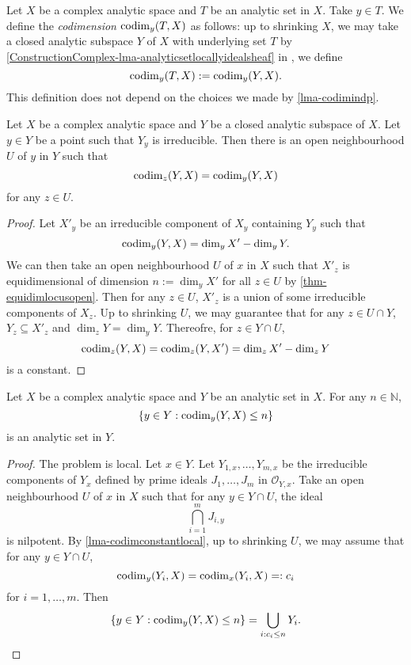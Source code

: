 \begin{definition}
    Let  $X$ be a complex analytic space and $T$ be an analytic set in $X$. Take $y\in T$. We define the \emph{codimension} $\operatorname{codim}_y(T,X)$ as follows: up to shrinking $X$, we may take a closed analytic subspace $Y$ of $X$ with underlying set $T$ by \cref{ConstructionComplex-lma-analyticsetlocallyidealsheaf} in , we define 
    \[
        \operatorname{codim}_y(T,X):=\operatorname{codim}_y(Y,X).  
    \]
    This definition does not depend on the choices we made by \cref{lma-codimindp}.
\end{definition}

\begin{lemma}\label{lma-codimconstantlocal}
    Let $X$ be a complex analytic space and $Y$ be a closed analytic subspace of $X$. Let $y\in Y$ be a point such that $Y_y$ is irreducible. Then there is an open neighbourhood $U$ of $y$ in $Y$ such that 
    \[
        \operatorname{codim}_z(Y,X)=\operatorname{codim}_y(Y,X)  
    \]
    for any $z\in U$.
\end{lemma}
\begin{proof}
    Let $X'_y$ be an irreducible component of $X_y$ containing $Y_y$ such that 
    \[
        \operatorname{codim}_y(Y,X)=\dim_y X'-\dim_y  Y.
    \]
    We can then take an open neighbourhood $U$ of $x$ in $X$ such that $X'_z$ is equidimensional of dimension $n:=\dim_y X'$ for all $z\in U$ by \cref{thm-equidimlocusopen}. Then for any $z\in U$, $X'_z$ is a union of some irreducible components of $X_z$. Up to shrinking $U$, we may guarantee that for any $z\in U\cap Y$, $Y_z\subseteq X'_z$ and $\dim_z Y=\dim_y Y$. Thereofre, for $z\in Y\cap U$,
    \[
        \operatorname{codim}_z(Y,X)=\operatorname{codim}_z(Y,X')=\dim_z X'-\dim_z Y  
    \]
    is a constant.
\end{proof}

\begin{corollary}\label{cor-codimgeqnanalytic}
    Let $X$ be a complex analytic space and $Y$ be an analytic set in $X$. For any $n\in \mathbb{N}$, 
    \[
        \left\{ y\in Y: \operatorname{codim}_y(Y,X)\leq n\right\}
    \]
    is an analytic set in $Y$.
\end{corollary}
\begin{proof}
    The problem is local. Let $x\in Y$. Let $Y_{1,x},\ldots,Y_{m,x}$ be the irreducible components of $Y_x$ defined by prime ideals $J_1,\ldots,J_m$ in $\mathcal{O}_{Y,x}$. Take an open neighbourhood $U$ of $x$ in $X$ such that for any $y\in Y\cap U$, the ideal 
    \[
        \bigcap_{i=1}^m J_{i,y}  
    \]
    is nilpotent. By \cref{lma-codimconstantlocal}, up to shrinking $U$, we may assume that for any $y\in Y\cap U$,
    \[
        \operatorname{codim}_y(Y_i,X)=\operatorname{codim}_x(Y_i,X)=:c_i  
    \]
    for $i=1,\ldots,m$. Then 
    \[
        \left\{ y\in Y: \operatorname{codim}_y(Y,X)\leq n\right\}=\bigcup_{i:c_i\leq n} Y_i.  
    \]
\end{proof}

